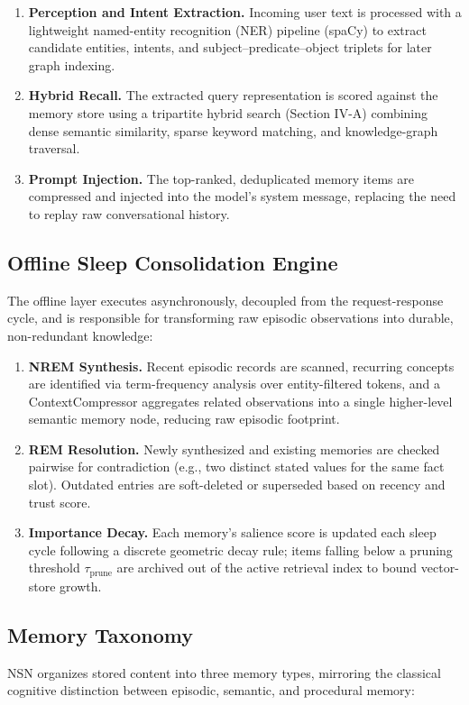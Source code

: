 \documentclass[conference]{IEEEtran}
\begin{document}
\begin{enumerate}
    \item \textbf{Perception and Intent Extraction.} Incoming user text is processed with a lightweight named-entity recognition (NER) pipeline (spaCy) to extract candidate entities, intents, and subject--predicate--object triplets for later graph indexing.
    \item \textbf{Hybrid Recall.} The extracted query representation is scored against the memory store using a tripartite hybrid search (Section IV-A) combining dense semantic similarity, sparse keyword matching, and knowledge-graph traversal.
    \item \textbf{Prompt Injection.} The top-ranked, deduplicated memory items are compressed and injected into the model's system message, replacing the need to replay raw conversational history.
\end{enumerate}

\subsection{Offline Sleep Consolidation Engine}
The offline layer executes asynchronously, decoupled from the request-response cycle, and is responsible for transforming raw episodic observations into durable, non-redundant knowledge:

\begin{enumerate}
    \item \textbf{NREM Synthesis.} Recent episodic records are scanned, recurring concepts are identified via term-frequency analysis over entity-filtered tokens, and a ContextCompressor aggregates related observations into a single higher-level semantic memory node, reducing raw episodic footprint.
    \item \textbf{REM Resolution.} Newly synthesized and existing memories are checked pairwise for contradiction (e.g., two distinct stated values for the same fact slot). Outdated entries are soft-deleted or superseded based on recency and trust score.
    \item \textbf{Importance Decay.} Each memory's salience score is updated each sleep cycle following a discrete geometric decay rule; items falling below a pruning threshold $\tau_{\text{prune}}$ are archived out of the active retrieval index to bound vector-store growth.
\end{enumerate}

\subsection{Memory Taxonomy}
NSN organizes stored content into three memory types, mirroring the classical cognitive distinction between episodic, semantic, and procedural memory:
\end{document}
